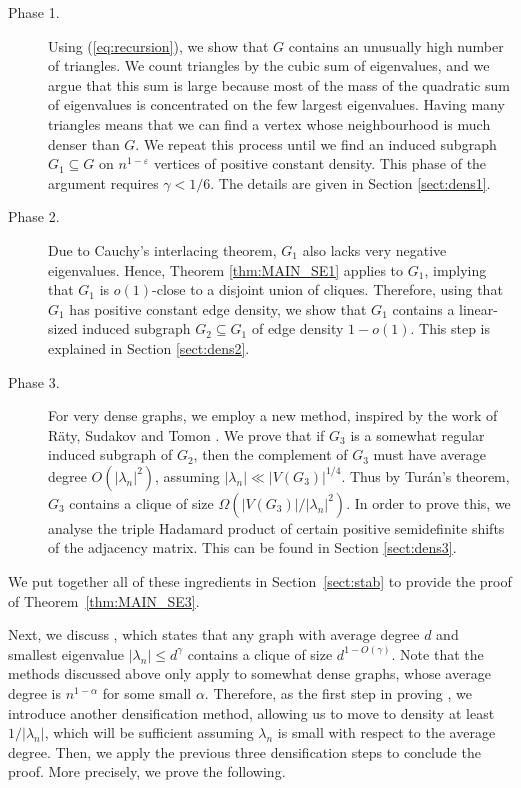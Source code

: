 \documentclass[11pt]{article}
\theoremstyle{plain}
\theoremstyle{definition}
\newcommand{\eps}{\varepsilon}
\begin{document}
 \begin{description}
    \item[Phase 1.] Using (\ref{eq:recursion}), we show that $G$ contains an unusually high number of triangles. We count triangles by the cubic sum of eigenvalues, and we argue that this sum is large because most of the mass of the quadratic sum of eigenvalues is concentrated on the few largest eigenvalues. Having many triangles means that we can find a vertex whose neighbourhood is much denser than $G$. We repeat this process until we find an induced subgraph $G_1\subseteq G$ on $n^{1-\eps}$ vertices of positive constant density. This phase of the argument requires $\gamma<1/6$. The details are given in Section \ref{sect:dens1}.

    \item[Phase 2.] Due to Cauchy's interlacing theorem, $G_1$ also lacks very negative eigenvalues. Hence, Theorem \ref{thm:MAIN_SE1} applies to $G_1$, implying that $G_1$ is $o(1)$-close to a disjoint union of cliques. Therefore, using that $G_1$ has positive constant edge density, we show that $G_1$ contains a linear-sized induced subgraph $G_2\subseteq G_1$ of edge density $1-o(1)$. This step is explained in Section \ref{sect:dens2}.

    \item[Phase 3.] For very dense graphs, we employ a new method, inspired by the work of R\"aty, Sudakov and Tomon \cite{RST}. We prove that if $G_3$ is a somewhat regular induced subgraph of $G_2$, then the complement of $G_3$ must have average degree $O(|\lambda_n|^2)$, assuming $|\lambda_n|\ll |V(G_3)|^{1/4}$. Thus by Tur\'an's theorem, $G_3$ contains a clique of size $\Omega(|V(G_3)|/|\lambda_n|^2)$. In order to prove this, we analyse the triple Hadamard product of certain positive semidefinite shifts of the adjacency matrix. This can be found in Section \ref{sect:dens3}.
 
\end{description}
\noindent
We put together all of these ingredients in Section~\ref{sect:stab} to provide the proof of Theorem~\ref{thm:MAIN_SE3}.

Next, we discuss , which states that any graph with average degree $d$ and smallest eigenvalue $|\lambda_n|\leq d^{\gamma}$ contains a clique of size $d^{1-O(\gamma)}$. Note that the methods discussed above only apply to somewhat dense graphs, whose average degree is $n^{1-\alpha}$ for some small $\alpha$. Therefore, as the first step in proving , we introduce another densification method, allowing us to move to density at least $1/|\lambda_n|$, which will be sufficient assuming $\lambda_n$ is small with respect to the average degree. Then, we apply the previous three densification steps to conclude the proof. More precisely, we prove the following.
\end{document}
